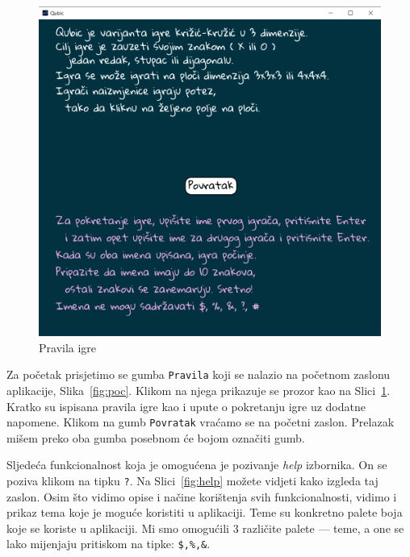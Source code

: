 \documentclass[12pt]{scrartcl}
\begin{document}
\begin{figure}[h]
	\centering
	\includegraphics[scale=0.3]{pravila.png}
	\caption{Pravila igre}
	\label{fig:pravila}
\end{figure}


 Za početak prisjetimo se gumba \texttt{Pravila} koji se nalazio na početnom zaslonu aplikacije, Slika~\ref{fig:poc}. Klikom na njega prikazuje se prozor kao na Slici~\ref{fig:pravila}. Kratko su ispisana pravila igre kao i upute o pokretanju igre uz dodatne napomene. Klikom na gumb \texttt{Povratak} vraćamo se na početni zaslon. Prelazak mišem preko oba gumba posebnom će bojom označiti gumb. 


Sljedeća funkcionalnost koja je omogućena je pozivanje \emph{help} izbornika. On se poziva klikom na tipku \texttt{?}. Na Slici~\ref{fig:help} možete vidjeti kako izgleda taj zaslon. Osim što vidimo opise i načine korištenja svih funkcionalnosti, vidimo i prikaz tema koje je moguće koristiti u aplikaciji. Teme su konkretno palete boja koje se koriste u aplikaciji. Mi smo omogućili 3 različite palete --- teme, a one se lako mijenjaju pritiskom na tipke: \texttt{\$,\%,\&}.
\end{document}
